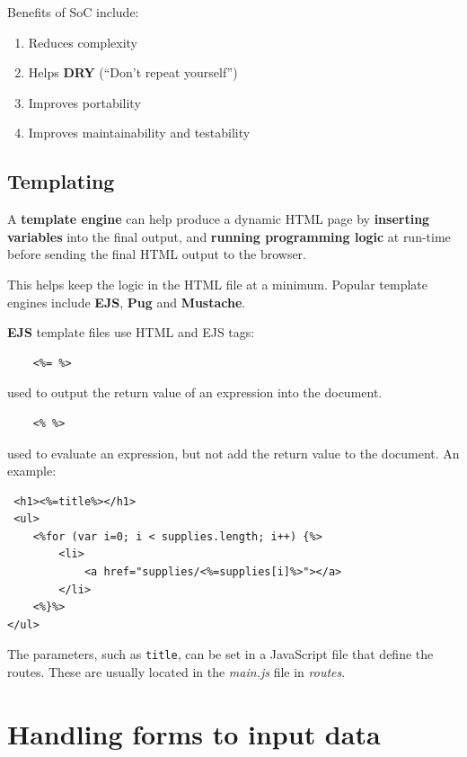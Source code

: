 Benefits of SoC include:

\begin{enumerate}
	\item Reduces complexity
	\item Helps \textbf{DRY} (``Don't repeat yourself'') 
	\item Improves portability
	\item Improves maintainability and testability
\end{enumerate}

\subsection{Templating}
A \textbf{template engine} can help produce a dynamic HTML page by \textbf{inserting variables} into the final output, and \textbf{running programming logic} at run-time before sending the final HTML output to the browser.

This helps keep the logic in the HTML file at a minimum. Popular template engines include \textbf{EJS}, \textbf{Pug} and \textbf{Mustache}.

\textbf{EJS} template files use HTML and EJS tags:
\begin{lstlisting}
	<%= %> 
\end{lstlisting}
used to output the return value of an expression into the document.
\begin{lstlisting}
	<% %> 
\end{lstlisting}
used to evaluate an expression, but not add the return value to the document.
An example:
\begin{verbatim}
 <h1><%=title%></h1>
 <ul>
	<%for (var i=0; i < supplies.length; i++) {%>
		<li>
			<a href="supplies/<%=supplies[i]%>"></a>
		</li>
	<%}%>
</ul>
\end{verbatim}
The parameters, such as \texttt{title}, can be set in a JavaScript file that define the routes. These are usually located in the \emph{main.js} file in \emph{routes}.  


\section{Handling forms to input data}

